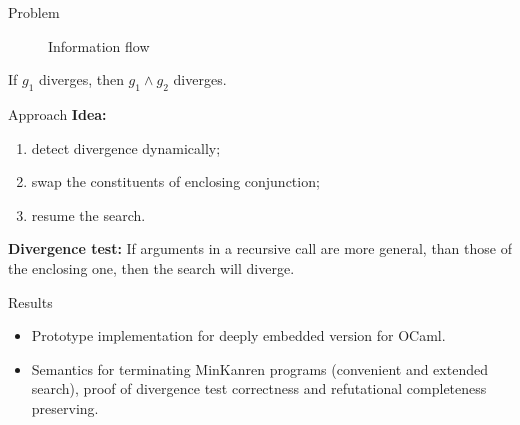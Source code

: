\documentclass[final,20pt]{beamer}
\begin{document}
\begin{frame}[t]
\begin{columns}[t]
\begin{column}{\onecolwid}
\begin{block}{Problem}
      \begin{figure}
        \caption{Information flow}
      \end{figure}
      
      If $g_1$ diverges, then $g_1 \wedge g_2$ diverges. 
      \vskip8mm
    \end{block}    
    
    \begin{block}{Approach}
       \vskip8mm
      \textbf{Idea:}
      	\begin{enumerate}
      	\justifying
      	\item detect divergence dynamically;
      	\item swap the constituents of enclosing conjunction;
      	\item resume the search.
      	\end{enumerate}
      
      \vskip8mm
      \textbf{Divergence test:}
      \vskip8mm
      If arguments in a recursive call are more general, than those of the enclosing one, then the search will diverge.
      \vskip8mm
      
      \end{block}
   
    \begin{block}{Results}
    
    \vskip5mm
    
    \begin{itemize}
      \item Prototype implementation for deeply embedded version for OCaml.
      \item Semantics for terminating MinKanren programs (convenient and extended search), proof of divergence test correctness and refutational completeness preserving.
    \end{itemize}
    \vskip8mm  
    

\end{block}
\end{column}
\end{columns}
\end{frame}
\end{document}
